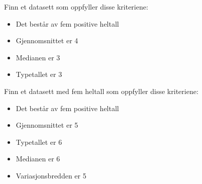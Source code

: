 Finn et datasett som oppfyller disse kriteriene:
\begin{itemize}
\item Det består av fem positive heltall
\item Gjennomsnittet er 4
\item Medianen er 3
\item Typetallet er 3
\end{itemize}
\newpage
{}
Finn et datasett med fem heltall som oppfyller disse kriteriene:
\begin{itemize}
	\item Det består av fem positive heltall
	\item Gjennomsnittet er 5
	\item Typetallet er 6
	\item Medianen er 6
	\item Variasjonsbredden er 5
\end{itemize}

